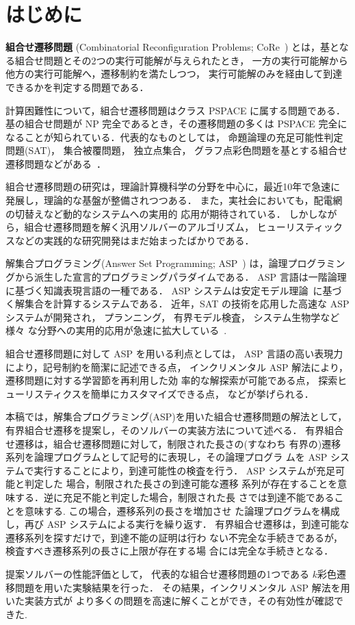 ﻿%
\section{はじめに}\label{chap:introduction}

\textbf{組合せ遷移問題}
(Combinatorial Reconfiguration Problems;
CoRe~\cite{core:ItoDHPSUU11,core:Nishimura18,core:Heuvel13})
とは，基となる組合せ問題とその2つの実行可能解が与えられたとき，
一方の実行可能解から他方の実行可能解へ，遷移制約を満たしつつ，
実行可能解のみを経由して到達できるかを判定する問題である．

計算困難性について，組合せ遷移問題はクラス PSPACE に属する問題である．
基の組合せ問題が NP 完全であるとき，その遷移問題の多くは PSPACE 完全に
なることが知られている．代表的なものとしては，
命題論理の充足可能性判定問題(SAT)，
集合被覆問題，
独立点集合，
グラフ点彩色問題を基とする組合せ遷移問題などがある~\cite{%
  core:gcp:BonsmaC09,%
  core:gcp:CerecedaHJ11,%
  core:sat:GopalanKMP09,%
  core:ItoDHPSUU11%
}．

組合せ遷移問題の研究は，理論計算機科学の分野を中心に，最近10年で急速に
発展し，理論的な基盤が整備されつつある．
また，実社会においても，配電網の切替えなど動的なシステムへの実用的
応用が期待されている．
しかしながら，組合せ遷移問題を解く汎用ソルバーのアルゴリズム，
ヒューリスティックスなどの実践的な研究開発はまだ始まったばかりである．

解集合プログラミング(Answer Set Programming; ASP~\cite{%
Baral03:cambridge,%
Gelfond88:iclp,%
Inoue08:jssst,%
Niemela99:amai})
は，論理プログラミングから派生した宣言的プログラミングパラダイムである．
ASP 言語は一階論理に基づく知識表現言語の一種である．
ASP システムは安定モデル理論~\cite{Gelfond88:iclp}に基づく解集合を計算するシステムである．
近年，SAT の技術を応用した高速な ASP システムが開発され，
プランニング，
有界モデル検査，
システム生物学など様々
な分野への実用的応用が急速に拡大している~\cite{Erdem16:AI}.

組合せ遷移問題に対して ASP を用いる利点としては，
ASP 言語の高い表現力により，記号制約を簡潔に記述できる点，
インクリメンタル ASP 解法により，遷移問題に対する学習節を再利用した効
率的な解探索が可能である点，
探索ヒューリスティクスを簡単にカスタマイズできる点，
などが挙げられる．

本稿では，解集合プログラミング(ASP)を用いた組合せ遷移問題の解法として，
有界組合せ遷移を提案し，そのソルバーの実装方法について述べる．
有界組合せ遷移は，組合せ遷移問題に対して，制限された長さの(すなわち
有界の)遷移系列を論理プログラムとして記号的に表現し，その論理プログラ
ムを ASP システムで実行することにより，到達可能性の検査を行う．
ASP システムが充足可能と判定した 場合，制限された長さの到達可能な遷移
系列が存在することを意味する．逆に充足不能と判定した場合，制限された長
さでは到達不能であることを意味する. この場合，遷移系列の長さを増加させ
た論理プログラムを構成し，再び ASP システムによる実行を繰り返す．
有界組合せ遷移は，到達可能な遷移系列を探すだけで，到達不能の証明は行わ
ない不完全な手続きであるが，検査すべき遷移系列の長さに上限が存在する場
合には完全な手続きとなる．

提案ソルバーの性能評価として，
代表的な組合せ遷移問題の1つである
$k$彩色遷移問題を用いた実験結果を行った．
その結果，インクリメンタル ASP 解法を用いた実装方式が
より多くの問題を高速に解くことができ，その有効性が確認できた.

